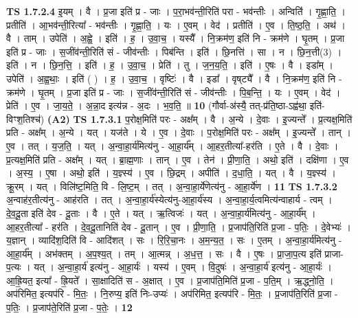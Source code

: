 \documentclass[17pt]{extarticle}
\begin{document}
                  \newline
                                \textbf{ TS 1.7.2.4} \newline
                  इ॒यम् । वै । प्र॒जा इति॑ प्र - जाः । प॒रा॒भव॑न्ती॒रिति॑ परा - भव॑न्तीः । अन्विति॑॑ । गृ॒ह्णा॒ति॒ । प्रतीति॑ । आ॒भव॑न्ती॒रित्या᳚ - भव॑न्तीः । गृ॒ह्णा॒ति॒ । यः । ए॒वम् । वेद॑ । प्रतीति॑ । ए॒व । ति॒ष्ठ॒ति॒ । अथ॑ । वै । ताम् । उपेति॑ । अ॒ह्वे॒ । इति॑ । ह॒ । उ॒वा॒च॒ । यस्यै᳚ । नि॒क्रम॑ण॒ इति॑ नि - क्रम॑णे । घृ॒तम् । प्र॒जा इति॑ प्र - जाः । स॒जींव॑न्ती॒रिति॑ सं - जीव॑न्तीः । पिब॑न्ति । इति॑ । छि॒नत्ति॑ । सा । न । छि॒न॒त्ती(3) । इति॑ । न । छि॒न॒त्ति॒ । इति॑ । ह॒ । उ॒वा॒च॒ । प्रेति॑ । तु । ज॒न॒य॒ति॒ । इति॑ । ए॒षः । वै । इडा᳚म् । उपेति॑ । अ॒ह्व॒थाः॒ । इति॑ ( ) । ह॒ । उ॒वा॒च॒ । वृष्टिः॑ । वै । इडा᳚ । वृष्‌ट्यै᳚ । वै । नि॒क्रम॑ण॒ इति॑ नि - क्रम॑णे । घृ॒तम् । प्र॒जा इति॑ प्र - जाः । स॒जींव॑न्ती॒रिति॑ सं - जीव॑न्तीः । पि॒ब॒न्ति॒ । यः । ए॒वम् । वेद॑ । प्रेति॑ । ए॒व । जा॒य॒ते॒ । अ॒न्ना॒द इत्य॑न्न - अ॒दः । भ॒व॒ति॒ ॥ \textbf{  10} \newline
                  \newline
                      (गौर्वा-अ॑स्यै॒ तत्-प्र॑ति॒ष्ठा-ऽह्व॑था॒ इति॑-विꣳश॒तिश्च॑)  \textbf{(A2)} \newline \newline
                                \textbf{ TS 1.7.3.1} \newline
                  प॒रोक्ष॒मिति॑ परः - अक्ष᳚म् । वै । अ॒न्ये । दे॒वाः । इ॒ज्यन्ते᳚ । प्र॒त्यक्ष॒मिति॑ प्रति - अक्ष᳚म् । अ॒न्ये । यत् । यज॑ते । ये । ए॒व । दे॒वाः । प॒रोक्ष॒मिति॑ परः - अक्ष᳚म् । इ॒ज्यन्ते᳚ । तान् । ए॒व । तत् । य॒ज॒ति॒ । यत् । अ॒न्वा॒हा॒र्य॑मित्य॑नु - आ॒हा॒र्य᳚म् । आ॒हर॒तीत्या᳚-हर॑ति । ए॒ते । वै । दे॒वाः । प्र॒त्यक्ष॒मिति॑ प्रति - अक्ष᳚म् । यत् । ब्रा॒ह्म॒णाः । तान् । ए॒व । तेन॑ । प्री॒णा॒ति॒ । अथो॒ इति॑ । दक्षि॑णा । ए॒व । अ॒स्य॒ । ए॒षा । अथो॒ इति॑ । य॒ज्ञ्स्य॑ । ए॒व । छि॒द्रम् । अपीति॑ । द॒धा॒ति॒ । यत् । वै । य॒ज्ञ्स्य॑ । क्रू॒रम् । यत् । विलि॑ष्ट॒मिति॒ वि - लि॒ष्ट॒म् । तत् । अ॒न्वा॒हा॒र्ये॑णेत्य॑नु - आ॒हा॒र्ये॑ण । \textbf{  11} \newline
                  \newline
                                \textbf{ TS 1.7.3.2} \newline
                  अ॒न्वाह॑र॒तीत्य॑नु - आह॑रति । तत् । अ॒न्वा॒हा॒र्य॑स्येत्य॑नु-आ॒हा॒र्य॑स्य । अ॒न्वा॒हा॒र्य॒त्वमित्य॑न्वाहार्य - त्वम् । दे॒व॒दू॒ता इति॑ देव - दू॒ताः । वै । ए॒ते । यत् । ऋ॒त्विजः॑ । यत् । अ॒न्वा॒हा॒र्य॑मित्य॑नु - आ॒हा॒र्य᳚म् । आ॒हर॒तीत्या᳚ - हर॑ति । दे॒व॒दू॒तानिति॑ देव - दू॒तान् । ए॒व । प्री॒णा॒ति॒ । प्र॒जाप॑ति॒रिति॑ प्र॒जा - प॒तिः॒ । दे॒वेभ्यः॑ । य॒ज्ञान् । व्यादि॑श॒दिति॑ वि - आदि॑शत् । सः । रि॒रि॒चा॒नः । अ॒म॒न्य॒त॒ । सः । ए॒तम् । अ॒न्वा॒हा॒र्य॑मित्य॑नु - आ॒हा॒र्य᳚म् । अभ॑क्तम् । अ॒प॒श्य॒त् । तम् । आ॒त्मन्न् । अ॒ध॒त्त॒ । सः । वै । ए॒षः । प्रा॒जा॒प॒त्य इति॑ प्राजा-प॒त्यः । यत् । अ॒न्वा॒हा॒र्य॑ इत्य॑नु - आ॒हा॒र्यः॑ । यस्य॑ । ए॒वम् । वि॒दुषः॑ । अ॒न्वा॒हा॒र्य॑ इत्य॑नु - आ॒हा॒र्यः॑ । आ॒ह्रि॒यत॒ इत्या᳚ - ह्रि॒यते᳚ । सा॒क्षादिति॑ स - अ॒क्षात् । ए॒व । प्र॒जाप॑ति॒मिति॑ प्र॒जा - प॒ति॒म् । ऋ॒द्ध्नो॒ति॒ । अप॑रिमित॒ इत्यप॑रि - मि॒तः॒ । नि॒रुप्य॒ इति॑ निः-उप्यः॑ । अप॑रिमित॒ इत्यप॑रि - मि॒तः॒ । प्र॒जाप॑ति॒रिति॑ प्र॒जा - प॒तिः॒ । प्र॒जाप॑ते॒रिति॑ प्र॒जा - प॒तेः॒ । \textbf{  12} \newline
\end{document}
